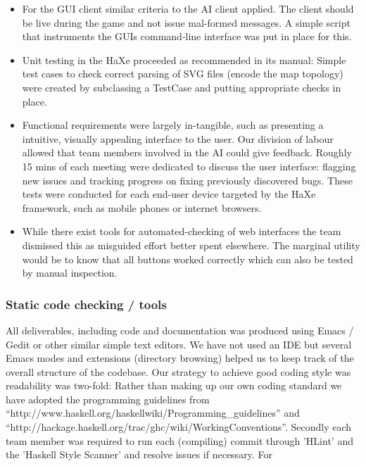 \documentclass[11pt]{article}
\begin{document}
\begin{itemize}

\item For the GUI client similar criteria to the AI client applied. The
      client should be live during the game and not issue mal-formed
      messages. A simple script that instruments the GUIs command-line
      interface was put in place for this.

\item Unit testing in the HaXe proceeded as recommended in its manual:
      Simple test cases to check correct parsing of SVG files (encode
      the map topology) were created by subclassing a TestCase and
      putting appropriate checks in place.  

\item Functional requirements were largely in-tangible, such as presenting a
      intuitive, visually appealing interface to the user. Our division of
      labour allowed that team members involved in the AI could give feedback.
      Roughly 15 mins of each meeting were dedicated to discuss the user
      interface: flagging new issues and tracking progress on fixing 
      previously discovered bugs. These tests were conducted for each
      end-user device targeted by the HaXe framework, such as mobile 
      phones or internet browsers.

\item While there exist tools for automated-checking of web interfaces 
      the team dismissed this as misguided effort better spent elsewhere.
      The marginal utility would be to know that all buttons worked correctly
      which can also be tested by manual inspection. 

\end{itemize}

\subsubsection{Static code checking / tools}
All deliverables, including code and documentation was produced using Emacs /
Gedit or other similar simple text editors. We have not used an IDE but several
Emacs modes and extensions (directory browsing) helped us to keep track of the
overall structure of the codebase. Our strategy to achieve good coding style
was readability was two-fold: Rather than making up our own coding standard
we have adopted the programming guidelines from ``http://www.haskell.org/haskellwiki/Programming_guidelines''
and ``http://hackage.haskell.org/trac/ghc/wiki/WorkingConventions''. Secondly
each team member was required to run each (compiling) commit through 'HLint'
and the 'Haskell Style Scanner' and resolve issues if necessary. For  
\end{document}
